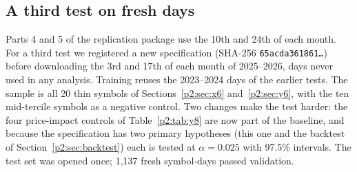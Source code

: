\subsection{A third test on fresh days}\label{p2:sec:z6}
Parts 4 and 5 of the replication package use the 10th and 24th of each month. For a third test we registered a new specification (SHA-256 \texttt{65acda361861\ldots}) before downloading the 3rd and 17th of each month of 2025--2026, days never used in any analysis. Training reuses the 2023--2024 days of the earlier tests. The sample is all 20 thin symbols of Sections~\ref{p2:sec:x6} and~\ref{p2:sec:y6}, with the ten mid-tercile symbols as a negative control. Two changes make the test harder: the four price-impact controls of Table~\ref{p2:tab:y8} are now part of the baseline, and because the specification has two primary hypotheses (this one and the backtest of Section~\ref{p2:sec:backtest}) each is tested at $\alpha=0.025$ with 97.5\% intervals. The test set was opened once; 1{,}137 fresh symbol-days passed validation.

